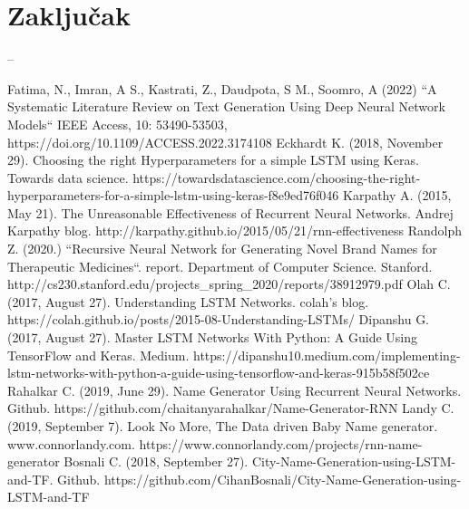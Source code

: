 \documentclass[conference]{IEEEtran}
\begin{document}
\section{Zaključak}
--


\begin{thebibliography}{00}
 Fatima, N., Imran, A S., Kastrati, Z., Daudpota, S M., Soomro, A (2022) ``A Systematic Literature Review on Text Generation Using Deep Neural Network Models``
IEEE Access, 10: 53490-53503, https://doi.org/10.1109/ACCESS.2022.3174108
 Eckhardt K. (2018, November 29). Choosing the right Hyperparameters for a simple LSTM using Keras. Towards data science. https://towardsdatascience.com/choosing-the-right-hyperparameters-for-a-simple-lstm-using-keras-f8e9ed76f046
 Karpathy A. (2015, May 21). The Unreasonable Effectiveness of Recurrent Neural Networks. Andrej Karpathy blog. http://karpathy.github.io/2015/05/21/rnn-effectiveness
 Randolph Z. (2020.) ``Recursive Neural Network for Generating Novel
Brand Names for Therapeutic Medicines``. report. Department of Computer Science. Stanford. http://cs230.stanford.edu/projects\_spring\_2020/reports/38912979.pdf
 Olah C. (2017, August 27). Understanding LSTM Networks. colah's blog. https://colah.github.io/posts/2015-08-Understanding-LSTMs/
 Dipanshu G. (2017, August 27). Master LSTM Networks With Python: A Guide Using TensorFlow and Keras. Medium. https://dipanshu10.medium.com/implementing-lstm-networks-with-python-a-guide-using-tensorflow-and-keras-915b58f502ce
 Rahalkar C. (2019, June 29). Name Generator Using Recurrent Neural Networks. Github. https://github.com/chaitanyarahalkar/Name-Generator-RNN
 Landy C. (2019, September 7). Look No More, The Data driven Baby Name generator. www.connorlandy.com. https://www.connorlandy.com/projects/rnn-name-generator
 Bosnali C. (2018, September 27). City-Name-Generation-using-LSTM-and-TF. Github. https://github.com/CihanBosnali/City-Name-Generation-using-LSTM-and-TF
\end{thebibliography}
\end{document}
